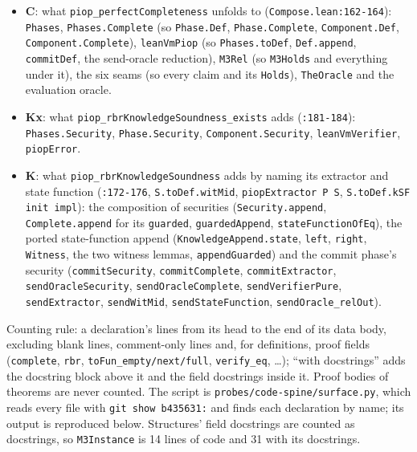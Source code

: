 \begin{itemize}
\item \textbf{C}: what \texttt{piop\_\allowbreak{}perfectCompleteness} unfolds to (\texttt{Compose.\allowbreak{}lean:162-{}164}): \texttt{Phases}, \texttt{Phases.\allowbreak{}Complete} (so \texttt{Phase.\allowbreak{}Def}, \texttt{Phase.\allowbreak{}Complete}, \texttt{Component.\allowbreak{}Def}, \texttt{Component.\allowbreak{}Complete}), \texttt{leanVmPiop} (so \texttt{Phases.\allowbreak{}toDef}, \texttt{Def.\allowbreak{}append}, \texttt{commitDef}, the send-oracle reduction), \texttt{M3Rel} (so \texttt{M3Holds} and everything under it), the six seams (so every claim and its \texttt{Holds}), \texttt{TheOracle} and the evaluation oracle.
\item \textbf{Kx}: what \texttt{p\allowbreak{}i\allowbreak{}o\allowbreak{}p\allowbreak{}\_\allowbreak{}r\allowbreak{}b\allowbreak{}r\allowbreak{}K\allowbreak{}n\allowbreak{}o\allowbreak{}w\allowbreak{}l\allowbreak{}e\allowbreak{}d\allowbreak{}g\allowbreak{}e\allowbreak{}S\allowbreak{}o\allowbreak{}u\allowbreak{}n\allowbreak{}d\allowbreak{}n\allowbreak{}e\allowbreak{}s\allowbreak{}s\allowbreak{}\_\allowbreak{}e\allowbreak{}x\allowbreak{}i\allowbreak{}s\allowbreak{}t\allowbreak{}s} adds (\texttt{:181-{}184}): \texttt{Phases.\allowbreak{}Security}, \texttt{Phase.\allowbreak{}Security}, \texttt{Component.\allowbreak{}Security}, \texttt{leanVmVerifier}, \texttt{piopError}.
\item \textbf{K}: what \texttt{piop\_\allowbreak{}rbrKnowledgeSoundness} adds by naming its extractor and state function (\texttt{:172-{}176}, \texttt{S.\allowbreak{}toDef.\allowbreak{}witMid}, \texttt{piopExtractor P S}, \texttt{S.\allowbreak{}toDef.\allowbreak{}kSF init impl}): the composition of securities (\texttt{Security.\allowbreak{}append}, \texttt{Complete.\allowbreak{}append} for its \texttt{guarded}, \texttt{guardedAppend}, \texttt{stateFunctionOfEq}), the ported state-function append (\texttt{KnowledgeAppend.\allowbreak{}state}, \texttt{left}, \texttt{right}, \texttt{Witness}, the two witness lemmas, \texttt{appendGuarded}) and the commit phase's security (\texttt{commitSecurity}, \texttt{commitComplete}, \texttt{commitExtractor}, \texttt{sendOracleSecurity}, \texttt{sendOracleComplete}, \texttt{sendVerifierPure}, \texttt{sendExtractor}, \texttt{sendWitMid}, \texttt{sendStateFunction}, \texttt{sendOracle\_\allowbreak{}relOut}).
\end{itemize}

Counting rule: a declaration's lines from its head to the end of its data body, excluding blank lines, comment-only lines and, for definitions, proof fields (\texttt{complete}, \texttt{rbr}, \texttt{toFun\_\allowbreak{}empty/\allowbreak{}next/\allowbreak{}full}, \texttt{verify\_\allowbreak{}eq}, …); \enquote{with docstrings} adds the docstring block above it and the field docstrings inside it. Proof bodies of theorems are never counted. The script is \texttt{probes/\allowbreak{}code-{}spine/\allowbreak{}surface.\allowbreak{}py}, which reads every file with \texttt{git show b435631:} and finds each declaration by name; its output is reproduced below. Structures' field docstrings are counted as docstrings, so \texttt{M3Instance} is 14 lines of code and 31 with its docstrings.

